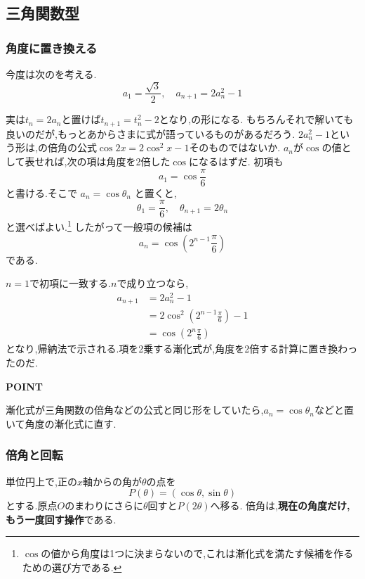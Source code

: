 \subsection{三角関数型}\label{節：三角関数型}
\subsubsection{角度に置き換える}\label{節：角度に置き換える}
今度は次のを考える.
\[
  a_1=\frac{\sqrt{3}}{2},\quad a_{n+1}=2a_n^2-1
\]

実は$t_n=2a_n$と置けば$t_{n+1}=t_n^2-2$となり,の形になる.
もちろんそれで解いても良いのだが,もっとあからさまに式が語っているものがあるだろう.
$2a_n^2-1$という形は,の倍角の公式$\cos2x=2\cos^2x-1$そのものではないか.
$a_n$が$\cos$の値として表せれば,次の項は角度を2倍した$\cos$になるはずだ.
初項も
\[
  a_1=\cos\frac{\pi}{6}
\]
と書ける.そこで $a_n=\cos\theta_n$ と置くと,
\[
  \theta_1=\frac{\pi}{6},
  \quad
  \theta_{n+1}=2\theta_n
\]
と選べばよい.\footnote{$\cos$の値から角度は1つに決まらないので,これは漸化式を満たす候補を作るための選び方である.}
したがって一般項の候補は
\[
  a_n=\cos\left(2^{n-1}\frac{\pi}{6}\right)
\]
である.

$n=1$で初項に一致する.$n$で成り立つなら,
\begin{align*}
  a_{n+1}
  &=2a_n^2-1\\
  &=2\cos^2\left(2^{n-1}\frac{\pi}{6}\right)-1\\
  &=\cos\left(2^n\frac{\pi}{6}\right)
\end{align*}
となり,帰納法で示される.項を2乗する漸化式が,角度を2倍する計算に置き換わったのだ.

\begin{bookpoint}
  \textbf{POINT}\par
  漸化式が三角関数の倍角などの公式と同じ形をしていたら,$a_n=\cos\theta_n$などと置いて角度の漸化式に直す.
\end{bookpoint}

\subsubsection{倍角と回転}\label{節：倍角と回転}
単位円上で,正の$x$軸からの角が$\theta$の点を
\[
  P(\theta)=(\cos\theta,\sin\theta)
\]
とする.原点$O$のまわりにさらに$\theta$回すと$P(2\theta)$へ移る.
倍角は,\textbf{現在の角度だけ,もう一度回す操作}である.

